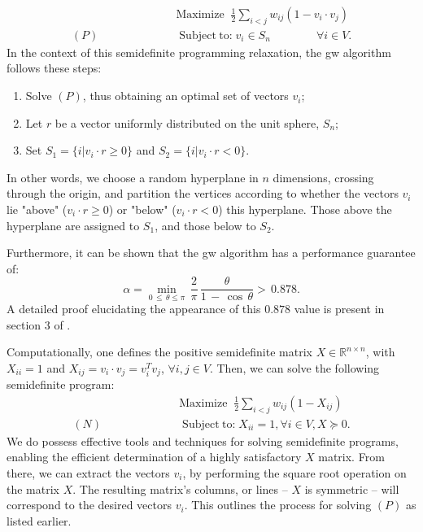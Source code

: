 \begin{equation}
  \begin{split}
  &\mathrm{Maximize}\;\;\frac{1}{2}\sum_{i<j}w_{i j}(1-v_{i} \cdot v_{j}) \\
  (P)\qquad\qquad\qquad&\operatorname{Subject\;to:}v_{i}\in S_n \qquad\qquad\forall i\in V.
  \end{split}
\end{equation}
In the context of this semidefinite programming relaxation, the \acrshort{gw} algorithm follows these steps:
\begin{enumerate}
  \item Solve $(P)$, thus obtaining an optimal set of vectors $v_{i}$;
  \item Let $r$ be a vector uniformly distributed on the unit sphere, $S_n$;
  \item Set $S_1 = \{i|v_{i} \cdot r \geq 0\}$ and $S_2 = \{i|v_{i} \cdot r < 0\}$.
\end{enumerate}
In other words, we choose a random hyperplane in $n$ dimensions, crossing through the origin, and partition the vertices according to whether the vectors $v_{i}$ lie "above" ($v_{i} \cdot r \geq 0$) or "below" ($v_{i} \cdot r < 0$) this hyperplane. Those above the hyperplane are assigned to $S_1$, and those below to $S_2$.

Furthermore, it can be shown that the \acrshort{gw} algorithm has a performance guarantee of:
\begin{equation}
  \alpha=\operatorname*{min}_{0\,\leq\,\theta\leq\pi}\,\frac{2}{\pi}\,\frac{\theta}{1\,-\,\cos\,\theta} > \,0.878.
\end{equation}
A detailed proof elucidating the appearance of this $0.878$ value is present in section $3$ of \cite{GW-Algorithm}.

Computationally, one defines the positive semidefinite matrix $X \in \mathbb{R}^{n \times n}$, with $X_{ii} = 1$ and $X_{ij} = v_{i} \cdot v_{j} = v_{i}^{T} v_j$, $\forall i, j \in V$. Then, we can solve the following semidefinite program:
\begin{equation}
  \begin{split}
  &\mathrm{Maximize}\;\;\frac{1}{2}\sum_{i<j}w_{i j}(1-X_{ij}) \\
  (N)\qquad\qquad\qquad&\operatorname{Subject\;to:}X_{ii} = 1, \forall i\in V, X \succeq 0.
  \end{split}
\end{equation}
We do possess effective tools and techniques for solving semidefinite programs, enabling the efficient determination of a highly satisfactory $X$ matrix. From there, we can extract the vectors $v_{i}$, by performing the square root operation on the matrix $X$. The resulting matrix's columns, or lines – $X$ is symmetric – will correspond to the desired vectors $v_{i}$. This outlines the process for solving $(P)$ as listed earlier.


